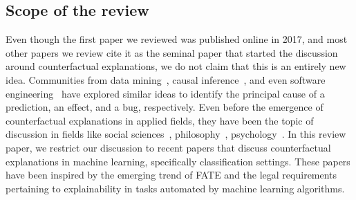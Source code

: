 \subsection{Scope of the review}
Even though the first paper we reviewed was published online in 2017, and most other papers we review cite it \citep{wachter_counterfactual_2017} as the seminal paper that started the discussion around counterfactual explanations, we do not claim that this is an entirely new idea. 
Communities from data mining~\cite{fernandez-loria_explaining_2020,Provost1}, causal inference~\cite{causality:Pearl}, and even software engineering~\cite{metamorphic-testing} have explored similar ideas to identify the principal cause of a prediction, an effect, and a bug, respectively. 
Even before the emergence of counterfactual explanations in applied fields, they have been the topic of discussion in fields like social sciences~\citep{Miller-xai:2019}, philosophy~\citep{Kment:phil1, Lewis1973:phil2, Ruben2004:phil3}, psychology~\citep{Byrne:psycho1,Byrne2019:psycho2,Kahneman1986:psycho3}. 
In this review paper, we restrict our discussion to recent papers that discuss counterfactual explanations in machine learning, specifically classification settings. 
These papers have been inspired by the emerging trend of FATE and the legal requirements pertaining to explainability in tasks automated by machine learning algorithms. 
